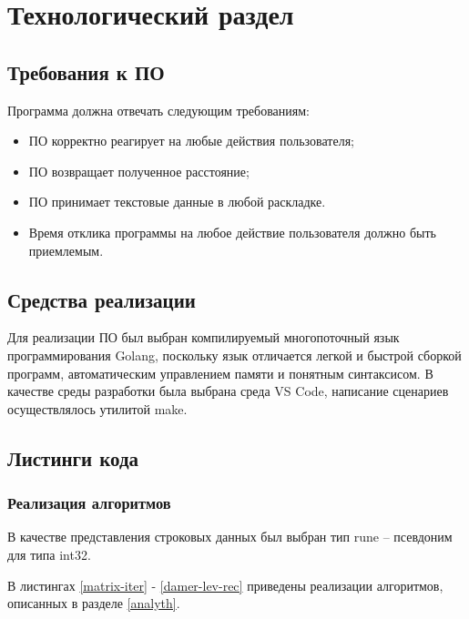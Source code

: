 \chapter{Технологический раздел}

\section{Требования к ПО}
Программа должна отвечать следующим требованиям:
\begin{itemize}
	\item ПО корректно реагирует на любые действия пользователя;
	\item ПО возвращает полученное расстояние;
	\item ПО принимает текстовые данные в любой раскладке.
	\item Время отклика программы на любое действие пользователя должно быть приемлемым.
\end{itemize}
\section{Средства реализации}
Для реализации ПО был выбран компилируемый многопоточный язык программирования Golang, поскольку язык отличается легкой и быстрой сборкой программ, автоматическим управлением памяти и понятным синтаксисом.
В качестве среды разработки была выбрана среда VS Code, написание сценариев осуществлялось утилитой make.
\section{Листинги кода}
\subsection{Реализация алгоритмов}

В качестве представления строковых данных был выбран тип rune\cite{rune} -- псевдоним для типа int32. 

В листингах \ref{matrix-iter} - \ref{damer-lev-rec} приведены реализации алгоритмов, описанных в разделе \ref{analyth}.


